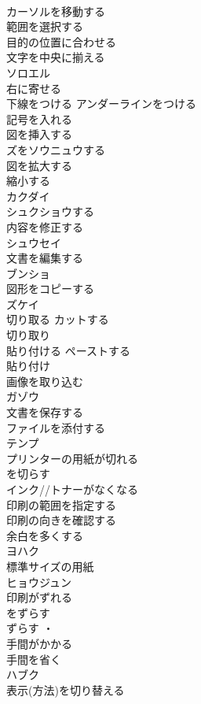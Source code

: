 \documentclass[8pt]{extreport}
\begin{document}
\begin{CJK}{UTF8}{min}
\\	カーソルを移動する	
\\	範囲を選択する	
\\	目的の位置に合わせる	
\\	文字を中央に揃える	
\\	ソロエル
\\	右に寄せる	
\\	下線をつける アンダーラインをつける	
\\	記号を入れる	
\\	図を挿入する	
\\	ズをソウニュウする
\\	図を拡大する 
\\	縮小する	
\\	カクダイ 
\\	シュクショウする 
\\	内容を修正する	
\\	シュウセイ
\\	文書を編集する	
\\	ブンショ
\\	図形をコピーする	
\\	ズケイ
\\	切り取る カットする 
\\	切り取り 
\\	貼り付ける ペーストする 
\\	貼り付け	
\\	画像を取り込む	
\\	ガゾウ
\\	文書を保存する	
\\	ファイルを添付する	
\\	テンプ
\\	プリンターの用紙が切れる 
\\	を切らす	
\\	インク//トナーがなくなる	
\\	印刷の範囲を指定する	
\\	印刷の向きを確認する	
\\	余白を多くする	
\\	ヨハク
\\	標準サイズの用紙	
\\	ヒョウジュン
\\	印刷がずれる 
\\	をずらす	
\\	ずらす ・
\\	手間がかかる	
\\	手間を省く	
\\	ハブク
\\	表示(方法)を切り替える	

\end{CJK}
\end{document}
